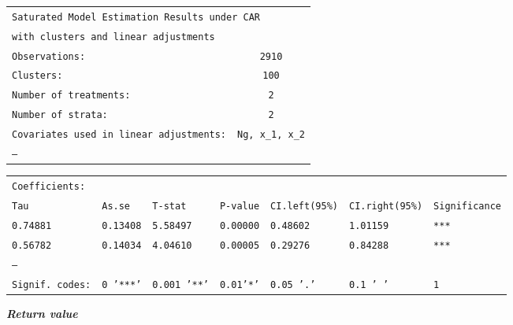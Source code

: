 \documentclass{article}
\begin{document}
\begin{flushleft}
\begin{tabular}{lc}
\multicolumn{2}{l}{\texttt{Saturated Model Estimation Results under CAR}} \\
\multicolumn{2}{l}{\texttt{with clusters and linear adjustments}} \\
\texttt{Observations:} & \texttt{2910} \\
\texttt{Clusters:} & \texttt{100} \\
\texttt{Number of treatments:} & \texttt{2} \\
\texttt{Number of strata:} & \texttt{2} \\
\texttt{Covariates used in linear adjustments:} & \texttt{Ng, x\_1, x\_2} \\
\texttt{---} \\
\end{tabular}
\end{flushleft}

\begin{flushleft}
\begin{tabular}{lllllll}
\texttt{Coefficients:} \\
\texttt{Tau} & \texttt{As.se} & \texttt{T-stat} & \texttt{P-value} & \texttt{CI.left(95\%)} & \texttt{CI.right(95\%)} & \texttt{Significance} \\
\texttt{0.74881} & \texttt{0.13408} & \texttt{5.58497} & \texttt{0.00000} & \texttt{0.48602} & \texttt{1.01159} & \texttt{***} \\
\texttt{0.56782} & \texttt{0.14034} & \texttt{4.04610} & \texttt{0.00005} & \texttt{0.29276} & \texttt{0.84288} & \texttt{***} \\
\texttt{---} \\
\texttt{Signif. codes:} & \texttt{0 '***'} & \texttt{0.001 '**'} & \texttt{0.01'*'} & \texttt{0.05 '.'} & \texttt{0.1 ' '} & \texttt{1} \\
\end{tabular}
\end{flushleft}

\noindent\textit{\textbf{Return value}}
\end{document}
